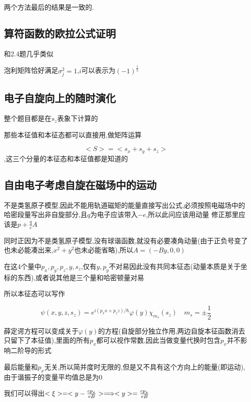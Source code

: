 \documentclass{article}
\begin{document}
            两个方法最后的结果是一致的.



        \subsection{算符函数的欧拉公式证明}
            和2.4题几乎类似

            泡利矩阵恰好满足$ \sigma_{j}^{2} = 1 $,$i$可以表示为$ (-1)^{\frac{1}{2}} $

        \subsection{电子自旋向上的随时演化}
            整个题目都是在$s_{z}$表象下计算的

            那些本征值和本征态都可以直接用,做矩阵运算

            $$ <S> = <s_{x} + s_{y} + s_{z}> $$,这三个分量的本征态和本征值都是知道的

        \subsection{自由电子考虑自旋在磁场中的运动}

            不是类氢原子模型,因此不能用轨道磁矩的能量直接写出公式,必须按照电磁场中的哈密段量写出非自旋部分,且$q$为电子应该带入$-e$,所以此问应该用动量
            修正那里应该是$ p + \frac{q}{c}A $

            同时正因为不是类氢原子模型,没有球谐函数,就没有必要凑角动量(由于正负号变了也未必能凑出来,$x^{2}+y^{2}$也未必能省略),所以$A = (-By,0,0)$

            在这4个量中$p_{x},p_{y},p_{z},y,s_{z}$,仅有$y,p_{y}$不对易因此没有共同本征态(动量本质是关于坐标的东西),或者说其他是三个量和哈密顿量对易

            所以本征态可以写作

            $$ \psi(x,y,z,s_{z}) = e^{i(p_{x}x+p_{z}z)/\hbar} \varphi(y) \chi_{m_{s}}(s_{z}) \quad m_{s} = \pm \frac{1}{2} $$ 
            
            薛定谔方程可以变成关于$\varphi(y)$的方程(自旋部分独立作用,两边自旋本征函数消去只留下了本征值),里面的所有$p_{x}$都可以视作常数,因此当做变量代换时包含$p_{x}$并不影响二阶导的形式
            
            最后能量和$p_{x}$无关,所以简并度时无限的,但是又不具有这个方向上的能量(即运动),由于谐振子的变量平均值总是为0

            我们可以得出$ <\xi> = <y -\frac{cp_{x}}{eB}> \Longrightarrow <y> = \frac{cp_{x}}{eB} $
\end{document}
